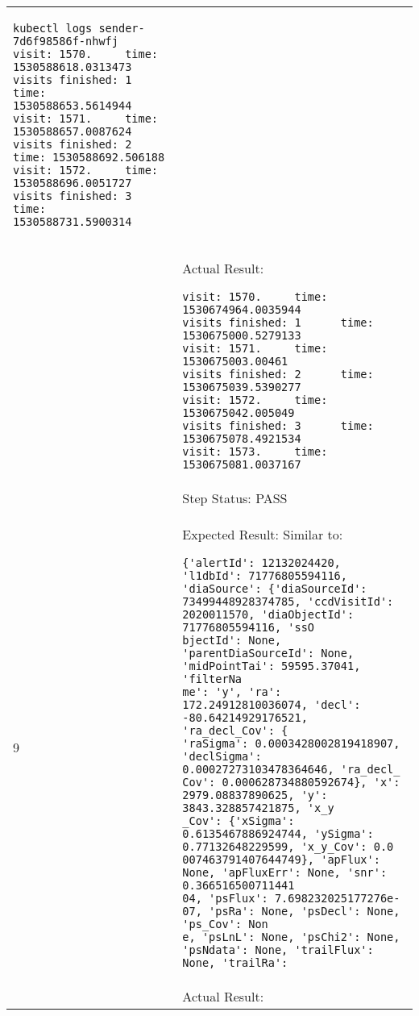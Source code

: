 \documentclass[DM,lsstdraft,STR,toc]{lsstdoc}
\begin{document}
\begin{longtable}{p{2cm}p{14cm}}
\scriptsize{
\begin{verbatim}
kubectl logs sender-7d6f98586f-nhwfj
visit: 1570.     time: 1530588618.0313473
visits finished: 1      time: 1530588653.5614944
visit: 1571.     time: 1530588657.0087624
visits finished: 2      time: 1530588692.506188
visit: 1572.     time: 1530588696.0051727
visits finished: 3      time: 1530588731.5900314
\end{verbatim}
}
 \\\cline{2-2}
  & Actual Result: 

\scriptsize{
\begin{verbatim}
visit: 1570.     time: 1530674964.0035944
visits finished: 1      time: 1530675000.5279133
visit: 1571.     time: 1530675003.00461
visits finished: 2      time: 1530675039.5390277
visit: 1572.     time: 1530675042.005049
visits finished: 3      time: 1530675078.4921534
visit: 1573.     time: 1530675081.0037167
\end{verbatim}
}

\\\cline{2-2}
  & Step Status: PASS \\\hline
9 & Expected Result: Similar to:

\scriptsize{
\begin{verbatim}
{'alertId': 12132024420, 'l1dbId': 71776805594116, 'diaSource': {'diaSourceId':
73499448928374785, 'ccdVisitId': 2020011570, 'diaObjectId': 71776805594116, 'ssO
bjectId': None, 'parentDiaSourceId': None, 'midPointTai': 59595.37041, 'filterNa
me': 'y', 'ra': 172.24912810036074, 'decl': -80.64214929176521, 'ra_decl_Cov': {
'raSigma': 0.0003428002819418907, 'declSigma': 0.00027273103478364646, 'ra_decl_
Cov': 0.000628734880592674}, 'x': 2979.08837890625, 'y': 3843.328857421875, 'x_y
_Cov': {'xSigma': 0.6135467886924744, 'ySigma': 0.77132648229599, 'x_y_Cov': 0.0
007463791407644749}, 'apFlux': None, 'apFluxErr': None, 'snr': 0.366516500711441
04, 'psFlux': 7.698232025177276e-07, 'psRa': None, 'psDecl': None, 'ps_Cov': Non
e, 'psLnL': None, 'psChi2': None, 'psNdata': None, 'trailFlux': None, 'trailRa':
\end{verbatim}
}

 \\\cline{2-2}
  & Actual Result: 


\end{longtable}
\end{document}
